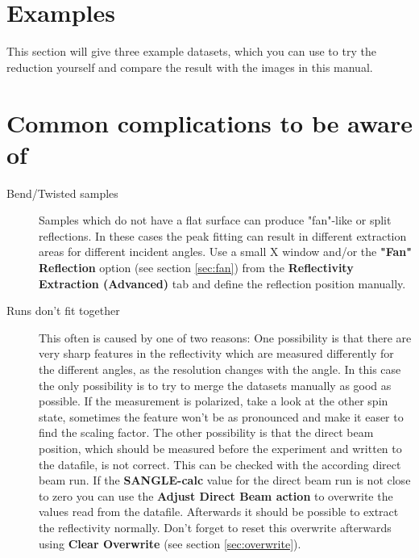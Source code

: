     

\section{Examples}
  This section will give three example datasets, which you can use to try the reduction yourself and compare the result with the images in this manual.
  
\section{Common complications to be aware of}
  \begin{description}
   \item[Bend/Twisted samples] Samples which do not have a flat surface can produce "fan"-like or split reflections. In these cases the peak fitting can result in different extraction areas for different incident angles. Use a small X window and/or the \textbf{"Fan" Reflection} option (see section \ref{sec:fan}) from the \textbf{Reflectivity Extraction (Advanced)} tab and define the reflection position manually.
   
   \item[Runs don't fit together] This often is caused by one of two reasons: 
   One possibility is that there are very sharp features in the reflectivity which are measured differently for the different angles, as the resolution changes with the angle.
   In this case the only possibility is to try to merge the datasets manually as good as possible.
   If the measurement is polarized, take a look at the other spin state, sometimes the feature won't be as pronounced and make it easer to find the scaling factor. 
   The other possibility is that the direct beam position, which should be measured before the experiment and written to the datafile, is not correct. 
   This can be checked with the according direct beam run. If the \textbf{SANGLE-calc} value for the direct beam run is not close to zero you can use the \textbf{Adjust Direct Beam action}  to overwrite the values read from the datafile. 
   Afterwards it should be possible to extract the reflectivity normally. 
   Don't forget to reset this overwrite afterwards using \textbf{Clear Overwrite} (see section \ref{sec:overwrite}).
  \end{description}

